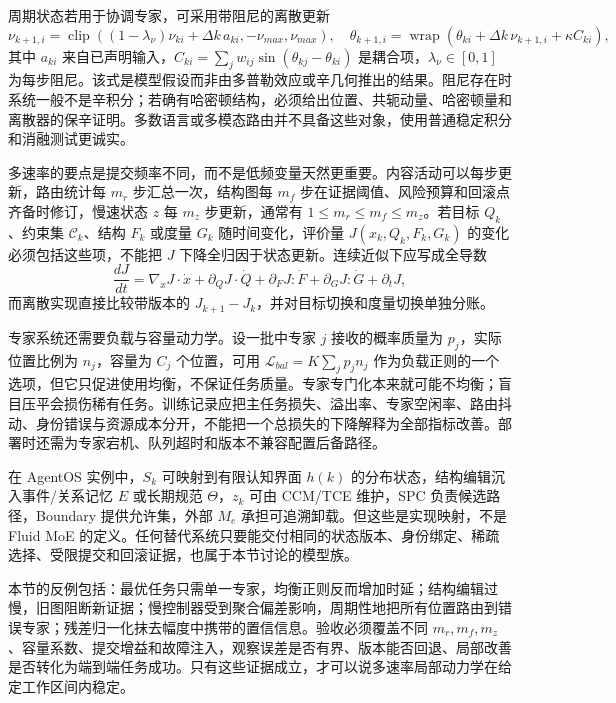 周期状态若用于协调专家，可采用带阻尼的离散更新
\begin{equation}
\nu_{k+1,i}=\operatorname{clip}\!\left((1-\lambda_\nu)\nu_{ki}+\Delta k\,a_{ki},-\nu_{max},\nu_{max}\right),
\quad
\theta_{k+1,i}=\operatorname{wrap}\!\left(\theta_{ki}+\Delta k\,\nu_{k+1,i}+\kappa C_{ki}\right),
\end{equation}
其中 $a_{ki}$ 来自已声明输入，$C_{ki}=\sum_jw_{ij}\sin(\theta_{kj}-\theta_{ki})$ 是耦合项，$\lambda_\nu\in[0,1]$ 为每步阻尼。该式是模型假设而非由多普勒效应或辛几何推出的结果。阻尼存在时系统一般不是辛积分；若确有哈密顿结构，必须给出位置、共轭动量、哈密顿量和离散器的保辛证明。多数语言或多模态路由并不具备这些对象，使用普通稳定积分和消融测试更诚实。

多速率的要点是提交频率不同，而不是低频变量天然更重要。内容活动可以每步更新，路由统计每 $m_r$ 步汇总一次，结构图每 $m_f$ 步在证据阈值、风险预算和回滚点齐备时修订，慢速状态 $z$ 每 $m_z$ 步更新，通常有 $1\le m_r\le m_f\le m_z$。若目标 $Q_k$、约束集 $\mathcal C_k$、结构 $F_k$ 或度量 $G_k$ 随时间变化，评价量 $J(x_k,Q_k,F_k,G_k)$ 的变化必须包括这些项，不能把 $J$ 下降全归因于状态更新。连续近似下应写成全导数
\begin{equation}
\frac{dJ}{dt}=\nabla_xJ\cdot\dot x+\partial_QJ\cdot\dot Q+\partial_FJ\!:\!\dot F+\partial_GJ\!:\!\dot G+\partial_tJ,
\end{equation}
而离散实现直接比较带版本的 $J_{k+1}-J_k$，并对目标切换和度量切换单独分账。

专家系统还需要负载与容量动力学。设一批中专家 $j$ 接收的概率质量为 $p_j$，实际位置比例为 $n_j$，容量为 $C_j$ 个位置，可用 $\mathcal L_{bal}=K\sum_jp_jn_j$ 作为负载正则的一个选项，但它只促进使用均衡，不保证任务质量。专家专门化本来就可能不均衡；盲目压平会损伤稀有任务。训练记录应把主任务损失、溢出率、专家空闲率、路由抖动、身份错误与资源成本分开，不能把一个总损失的下降解释为全部指标改善。部署时还需为专家宕机、队列超时和版本不兼容配置后备路径。

在 AgentOS 实例中，$S_k$ 可映射到有限认知界面 $h(k)$ 的分布状态，结构编辑沉入事件/关系记忆 $E$ 或长期规范 $\Theta$，$z_k$ 可由 CCM/TCE 维护，SPC 负责候选路径，Boundary 提供允许集，外部 $M_e$ 承担可追溯卸载。但这些是实现映射，不是 Fluid MoE 的定义。任何替代系统只要能交付相同的状态版本、身份绑定、稀疏选择、受限提交和回滚证据，也属于本节讨论的模型族。

本节的反例包括：最优任务只需单一专家，均衡正则反而增加时延；结构编辑过慢，旧图阻断新证据；慢控制器受到聚合偏差影响，周期性地把所有位置路由到错误专家；残差归一化抹去幅度中携带的置信信息。验收必须覆盖不同 $m_r,m_f,m_z$、容量系数、提交增益和故障注入，观察误差是否有界、版本能否回退、局部改善是否转化为端到端任务成功。只有这些证据成立，才可以说多速率局部动力学在给定工作区间内稳定。

